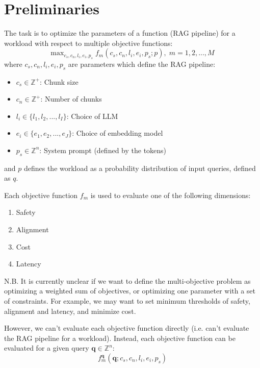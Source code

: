 \section{Preliminaries}
The task is to optimize the parameters of a function (RAG pipeline) for a workload with respect to multiple objective functions:
\begin{equation}
    \text{max}_{c_s, c_n, l_i, e_i, p_s} \; f_m(c_s, c_n, l_i, e_i, p_s; p), \; m=1,2,...,M
\end{equation}
where $c_s, c_n, l_i, e_i, p_s$ are parameters which define the RAG pipeline:
\begin{itemize}
    \item $c_s \in \mathbb{Z}^+$: Chunk size
    \item $c_n \in \mathbb{Z}^+$: Number of chunks
    \item $l_i \in \{l_1, l_2, ..., l_I\}$: Choice of LLM 
    \item $e_i \in \{e_1, e_2, ..., e_{J}\}$: Choice of embedding model
    \item $p_s \in \mathbb{Z}^n$: System prompt (defined by the tokens) 
\end{itemize}

and $p$ defines the workload as a probability distribution of input queries, defined as $q$.

Each objective function $f_m$ is used to evaluate one of the following dimensions:
\begin{enumerate}
    \item Safety
    \item Alignment
    \item Cost
    \item Latency
\end{enumerate}
N.B. It is currently unclear if we want to define the multi-objective problem as optimizing a weighted sum of objectives, or optimizing one parameter with a set of constraints. For example, we may want to set minimum thresholds of safety, alignment and latency, and minimize cost.

However, we can't evaluate each objective function directly (i.e. can't evaluate the RAG pipeline for a workload). Instead, each objective function can be evaluated for a given query $\mathbf{q} \in \mathbb{Z}^n$:
\begin{equation}
    f_m^{\mathbf{q}}(\mathbf{q} ; c_s, c_n, l_i, e_i, p_s)
\end{equation}

